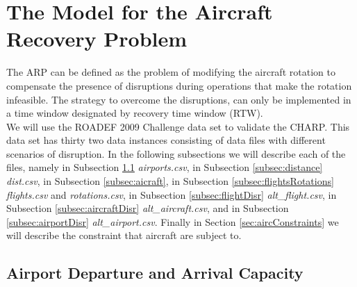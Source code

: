 \documentclass[ijoo,nonblindrev]{informs-ijoo}
\begin{document}
\section{The Model for the Aircraft Recovery Problem}\label{sec:modelARP}
The ARP can be defined as the problem of modifying the aircraft rotation to compensate the presence of disruptions during operations that make the rotation infeasible. The strategy to overcome the disruptions, can only be implemented in a time window designated by recovery time window (RTW).\\
	 We will use the ROADEF 2009 Challenge data set to validate the CHARP. This data set has thirty two data instances consisting of data files with different scenarios of disruption. In the following subsections we will describe each of the files, namely in Subsection  \ref{subsec:airports} \textit{airports.csv}, in Subsection \ref{subsec:distance} \textit{dist.csv}, in Subsection \ref{subsec:aicraft}, in Subsection \ref{subsec:flightsRotations} \textit{flights.csv} and \textit{rotations.csv}, in Subsection \ref{subsec:flightDisr} \textit{alt\_flight.csv}, in Subsection \ref{subsec:aircraftDisr} \textit{alt\_aircraft.csv}, and in Subsection \ref{subsec:airportDisr} \textit{alt\_airport.csv}. Finally in Section \ref{sec:aircConstraints} we will describe the constraint that aircraft are subject to.
	 




\subsection{Airport Departure and Arrival Capacity} \label{subsec:airports}
\end{document}
